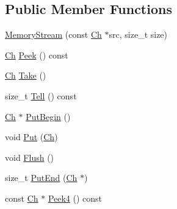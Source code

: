 \subsection*{Public Member Functions}
\begin{DoxyCompactItemize}
\item 
\mbox{\hyperlink{structrapidjson_1_1_memory_stream_a78a2158aae245de652bad7d53de1772c}{Memory\+Stream}} (const \mbox{\hyperlink{structrapidjson_1_1_memory_stream_abf9f7cf51a5830ae45e24f5d55fdceaf}{Ch}} $\ast$src, size\+\_\+t size)
\item 
\mbox{\hyperlink{structrapidjson_1_1_memory_stream_abf9f7cf51a5830ae45e24f5d55fdceaf}{Ch}} \mbox{\hyperlink{structrapidjson_1_1_memory_stream_abfe6486d171f52af46147031e0c65bb6}{Peek}} () const
\item 
\mbox{\hyperlink{structrapidjson_1_1_memory_stream_abf9f7cf51a5830ae45e24f5d55fdceaf}{Ch}} \mbox{\hyperlink{structrapidjson_1_1_memory_stream_aa0f6a8e627bc071d96bd1dbb50188f68}{Take}} ()
\item 
size\+\_\+t \mbox{\hyperlink{structrapidjson_1_1_memory_stream_ab759106a74ad078260c2c1029bfb7030}{Tell}} () const
\item 
\mbox{\hyperlink{structrapidjson_1_1_memory_stream_abf9f7cf51a5830ae45e24f5d55fdceaf}{Ch}} $\ast$ \mbox{\hyperlink{structrapidjson_1_1_memory_stream_a9cda045c9d01e18c4d4b06b2afe2edf2}{Put\+Begin}} ()
\item 
void \mbox{\hyperlink{structrapidjson_1_1_memory_stream_a3721da916bbddb54c97f631c3d8eb811}{Put}} (\mbox{\hyperlink{structrapidjson_1_1_memory_stream_abf9f7cf51a5830ae45e24f5d55fdceaf}{Ch}})
\item 
void \mbox{\hyperlink{structrapidjson_1_1_memory_stream_a1c16eac80906e4ff0c1ad1bc6fe43635}{Flush}} ()
\item 
size\+\_\+t \mbox{\hyperlink{structrapidjson_1_1_memory_stream_a2135b36b12e5fcd2ee575b9a9cdb579c}{Put\+End}} (\mbox{\hyperlink{structrapidjson_1_1_memory_stream_abf9f7cf51a5830ae45e24f5d55fdceaf}{Ch}} $\ast$)
\item 
const \mbox{\hyperlink{structrapidjson_1_1_memory_stream_abf9f7cf51a5830ae45e24f5d55fdceaf}{Ch}} $\ast$ \mbox{\hyperlink{structrapidjson_1_1_memory_stream_ad17be8ddf7b91d91b70fe1cdf5478d14}{Peek4}} () const
\end{DoxyCompactItemize}
